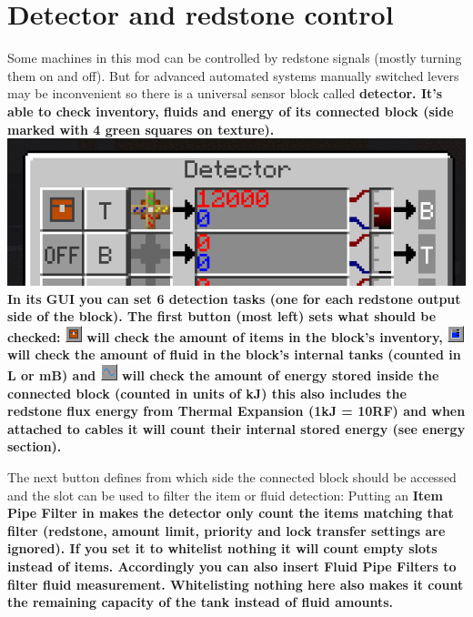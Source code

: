 \documentclass[11pt]{article} %
\begin{document}
\section{Detector and redstone control}
Some machines in this mod can be controlled by redstone signals (mostly turning them on and off). But for advanced automated systems manually switched levers may be inconvenient so there is a universal sensor block called \bf detector\rm . It's able to check inventory, fluids and energy of its connected block (side marked with 4 green squares on texture). \\
\includegraphics[width = \textwidth]{detector} \\
In its GUI you can set 6 detection tasks (one for each redstone output side of the block). The first button (most left) sets what should be checked: \includegraphics{detectItem} will check the amount of items in the block's inventory, \includegraphics{detectFluid} will check the amount of fluid in the block's internal tanks (counted in L or mB) and \includegraphics{detectEnergy} will check the amount of energy stored inside the connected block (counted in units of kJ) this also includes the redstone flux energy from Thermal Expansion (1kJ = 10RF) and when attached to cables it will count their internal stored energy (see energy section). 

The next button defines from which side the connected block should be accessed and the slot can be used to filter the item or fluid detection: Putting an \bf Item Pipe Filter \rm in makes the detector only count the items matching that filter (redstone, amount limit, priority and lock transfer settings are ignored). If you set it to whitelist nothing it will count empty slots instead of items. Accordingly you can also insert \bf Fluid Pipe Filters \rm to filter fluid measurement. Whitelisting nothing here also makes it count the remaining capacity of the tank instead of fluid amounts.
\end{document}
